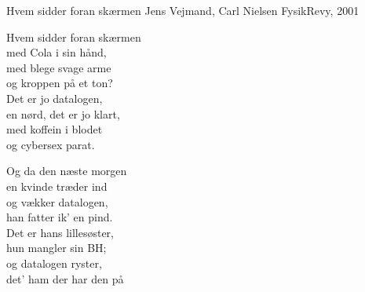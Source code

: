 \begin{song}{Hvem sidder foran skærmen}
  {} %
  {Jens Vejmand, Carl Nielsen} %
  {} %
  {FysikRevy, 2001} %
  {\NotCCLIed} %

  \begin{SBVerse}
    Hvem sidder foran skærmen\\
    med Cola i sin hånd,\\
    med blege svage arme\\
    og kroppen på et ton?\\
    \medskip
    Det er jo datalogen,\\
    en nørd, det er jo klart,\\
    med koffein i blodet\\
    og cybersex parat.
  \end{SBVerse}

  \begin{SBVerse}
    Og da den næste morgen\\
    en kvinde træder ind\\
    og vækker datalogen,\\
    han fatter ik' en pind.\\
    \medskip
    Det er hans lillesøster,\\
    hun mangler sin BH;\\
    og datalogen ryster,\\
    det' ham der har den på
  \end{SBVerse}
\end{song}